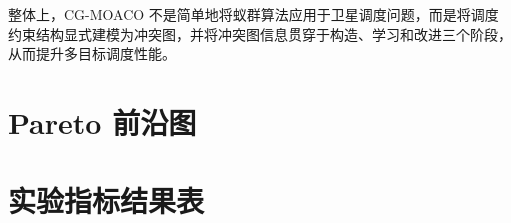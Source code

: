 \documentclass[UTF8,a4paper,12pt]{ctexart}
\begin{document}
整体上，CG-MOACO 不是简单地将蚁群算法应用于卫星调度问题，而是将调度约束结构显式建模为冲突图，并将冲突图信息贯穿于构造、学习和改进三个阶段，从而提升多目标调度性能。

\clearpage
\section*{Pareto 前沿图}




\clearpage
\section*{实验指标结果表}



\end{document}

